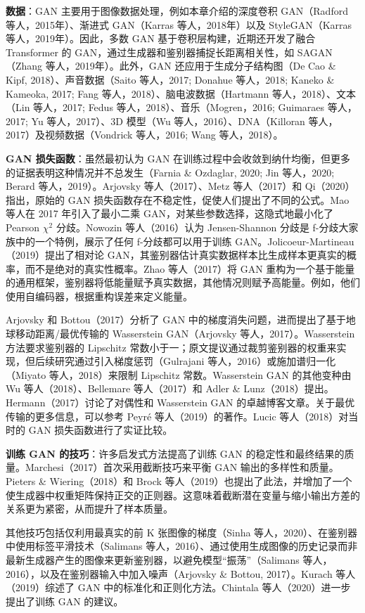 \documentclass[lang=cn,newtx,10pt,scheme=chinese]{elegantbook}
\begin{document}
\textbf{数据}：GAN 主要用于图像数据处理，例如本章介绍的深度卷积 GAN（Radford 等人，2015年）、渐进式 GAN（Karras 等人，2018年）以及 StyleGAN（Karras 等人，2019年）。因此，多数 GAN 基于卷积层构建，近期还开发了融合 Transformer 的 GAN，通过生成器和鉴别器捕捉长距离相关性，如 SAGAN（Zhang 等人，2019年）。此外，GAN 还应用于生成分子结构图（De Cao \& Kipf, 2018）、声音数据（Saito 等人，2017; Donahue 等人，2018; Kaneko \& Kameoka, 2017; Fang 等人，2018）、脑电波数据（Hartmann 等人，2018）、文本（Lin 等人，2017; Fedus 等人，2018）、音乐（Mogren，2016; Guimaraes 等人，2017; Yu 等人，2017）、3D 模型（Wu 等人，2016）、DNA（Killoran 等人，2017）及视频数据（Vondrick 等人，2016; Wang 等人，2018）。

\textbf{GAN 损失函数}：虽然最初认为 GAN 在训练过程中会收敛到纳什均衡，但更多的证据表明这种情况并不总发生（Farnia \& Ozdaglar, 2020; Jin 等人，2020; Berard 等人，2019）。Arjovsky 等人（2017）、Metz 等人（2017）和 Qi（2020）指出，原始的 GAN 损失函数存在不稳定性，促使人们提出了不同的公式。Mao 等人在 2017 年引入了最小二乘 GAN，对某些参数选择，这隐式地最小化了 Pearson \(\chi^2\) 分歧。Nowozin 等人（2016）认为 Jensen-Shannon 分歧是 f-分歧大家族中的一个特例，展示了任何 f-分歧都可以用于训练 GAN。Jolicoeur-Martineau（2019）提出了相对论 GAN，其鉴别器估计真实数据样本比生成样本更真实的概率，而不是绝对的真实性概率。Zhao 等人（2017）将 GAN 重构为一个基于能量的通用框架，鉴别器将低能量赋予真实数据，其他情况则赋予高能量。例如，他们使用自编码器，根据重构误差来定义能量。

Arjovsky 和 Bottou（2017）分析了 GAN 中的梯度消失问题，进而提出了基于地球移动距离/最优传输的 Wasserstein GAN（Arjovsky 等人，2017）。Wasserstein 方法要求鉴别器的 Lipschitz 常数小于一；原文提议通过裁剪鉴别器的权重来实现，但后续研究通过引入梯度惩罚（Gulrajani 等人，2016）或施加谱归一化（Miyato 等人，2018）来限制 Lipschitz 常数。Wasserstein GAN 的其他变种由 Wu 等人（2018）、Bellemare 等人（2017）和 Adler \& Lunz（2018）提出。Hermann（2017）讨论了对偶性和 Wasserstein GAN 的卓越博客文章。关于最优传输的更多信息，可以参考 Peyré 等人（2019）的著作。Lucic 等人（2018）对当时的 GAN 损失函数进行了实证比较。

\textbf{训练 GAN 的技巧}：许多启发式方法提高了训练 GAN 的稳定性和最终结果的质量。Marchesi（2017）首次采用截断技巧来平衡 GAN 输出的多样性和质量。Pieters \& Wiering（2018）和 Brock 等人（2019）也提出了此法，并增加了一个使生成器中权重矩阵保持正交的正则器。这意味着截断潜在变量与缩小输出方差的关系更为紧密，从而提升了样本质量。

其他技巧包括仅利用最真实的前 K 张图像的梯度（Sinha 等人，2020）、在鉴别器中使用标签平滑技术（Salimans 等人，2016）、通过使用生成图像的历史记录而非最新生成器产生的图像来更新鉴别器，以避免模型“振荡”（Salimans 等人，2016），以及在鉴别器输入中加入噪声（Arjovsky \& Bottou, 2017）。Kurach 等人（2019）综述了 GAN 中的标准化和正则化方法。Chintala 等人（2020）进一步提出了训练 GAN 的建议。
\end{document}
